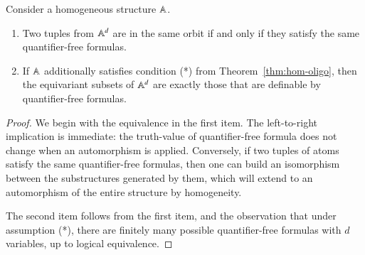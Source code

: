 \begin{theorem}\label{thm:fs-qf} Consider a  homogeneous structure $\mathbb A$. 
	\begin{enumerate}
		\item Two tuples from $\mathbb A^d$ are in the same orbit if and only if they satisfy the same quantifier-free formulas.
		\item 	 If $\mathbb A$ additionally satisfies condition (*) from Theorem~\ref{thm:hom-oligo}, then the equivariant subsets of $\mathbb A^d$ are exactly those that are definable by quantifier-free formulas.
	\end{enumerate}

	\end{theorem}
	\begin{proof} We begin with the equivalence in the first item. 
		The  left-to-right implication is immediate: the truth-value of quantifier-free formula does not change when an automorphism is applied. Conversely, if two tuples of atoms satisfy the same quantifier-free formulas, then one can build an isomorphism between the substructures generated by them, which will extend to  an automorphism of the entire structure by homogeneity.

		The second item follows from the first item, and the observation that under assumption (*), there are finitely many possible quantifier-free formulas with $d$ variables, up to logical equivalence. 
	\end{proof}
	
\exercisepart


